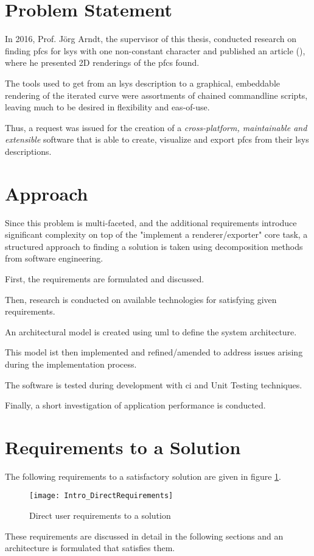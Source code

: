 \section{Problem Statement}
In 2016, Prof. Jörg Arndt, the supervisor of this thesis, conducted research on finding \gls{pfc}s for \gls{lsys} with one non-constant character and published an article (\cite{Arndt2016}), where he presented 2D renderings of the \gls{pfc}s found.

The tools used to get from an \gls{lsys} description to a graphical, embeddable rendering of the iterated curve were assortments of chained commandline scripts, leaving much to be desired in flexibility and eas-of-use.

Thus, a request was issued for the creation of a \emph{cross-platform, maintainable and extensible} software that is able to create, visualize and export \gls{pfc}s from their \gls{lsys} descriptions.

\section{Approach}

Since this problem is multi-faceted, and the additional requirements introduce significant complexity on top of the "implement a renderer/exporter" core task, a structured approach to finding a solution is taken using decomposition methods from software engineering.

First, the requirements are formulated and discussed.

Then, research is conducted on available technologies for satisfying given requirements.

An architectural model is created using \gls{uml} to define the system architecture.

This model ist then implemented and refined/amended to address issues arising during the implementation process.

The software is tested during development with \gls{ci} and \gls{Unit Testing} techniques.

Finally, a short investigation of application performance is conducted.

\section{Requirements to a Solution}
The following requirements to a satisfactory solution are given in figure \ref{img1}.

\begin{figure}[h]
	\texttt{[image: Intro\_DirectRequirements]}
	\caption{Direct user requirements to a solution}
	\label{img1}
\end{figure}

These requirements are discussed in detail in the following sections and an architecture is formulated that satisfies them.
